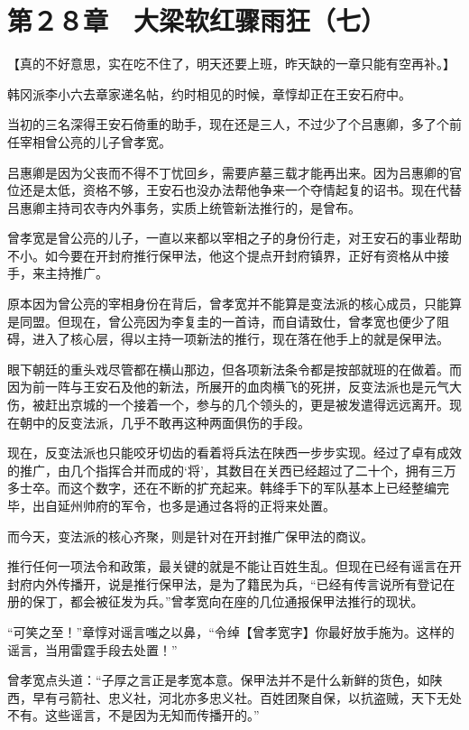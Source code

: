 \section{第２８章　大梁软红骤雨狂（七）}

【真的不好意思，实在吃不住了，明天还要上班，昨天缺的一章只能有空再补。】

韩冈派李小六去章家递名帖，约时相见的时候，章惇却正在王安石府中。

当初的三名深得王安石倚重的助手，现在还是三人，不过少了个吕惠卿，多了个前任宰相曾公亮的儿子曾孝宽。

吕惠卿是因为父丧而不得不丁忧回乡，需要庐墓三载才能再出来。因为吕惠卿的官位还是太低，资格不够，王安石也没办法帮他争来一个夺情起复的诏书。现在代替吕惠卿主持司农寺内外事务，实质上统管新法推行的，是曾布。

曾孝宽是曾公亮的儿子，一直以来都以宰相之子的身份行走，对王安石的事业帮助不小。如今要在开封府推行保甲法，他这个提点开封府镇界，正好有资格从中接手，来主持推广。

原本因为曾公亮的宰相身份在背后，曾孝宽并不能算是变法派的核心成员，只能算是同盟。但现在，曾公亮因为李复圭的一首诗，而自请致仕，曾孝宽也便少了阻碍，进入了核心层，得以主持一项新法的推行，现在落在他手上的就是保甲法。

眼下朝廷的重头戏尽管都在横山那边，但各项新法条令都是按部就班的在做着。而因为前一阵与王安石及他的新法，所展开的血肉横飞的死拼，反变法派也是元气大伤，被赶出京城的一个接着一个，参与的几个领头的，更是被发遣得远远离开。现在朝中的反变法派，几乎不敢再这种两面俱伤的手段。

现在，反变法派也只能咬牙切齿的看着将兵法在陕西一步步实现。经过了卓有成效的推广，由几个指挥合并而成的‘将’，其数目在关西已经超过了二十个，拥有三万多士卒。而这个数字，还在不断的扩充起来。韩绛手下的军队基本上已经整编完毕，出自延州帅府的军令，也多是通过各将的正将来处置。

而今天，变法派的核心齐聚，则是针对在开封推广保甲法的商议。

推行任何一项法令和政策，最关键的就是不能让百姓生乱。但现在已经有谣言在开封府内外传播开，说是推行保甲法，是为了籍民为兵，“已经有传言说所有登记在册的保丁，都会被征发为兵。”曾孝宽向在座的几位通报保甲法推行的现状。

“可笑之至！”章惇对谣言嗤之以鼻，“令绰【曾孝宽字】你最好放手施为。这样的谣言，当用雷霆手段去处置！”

曾孝宽点头道：“子厚之言正是孝宽本意。保甲法并不是什么新鲜的货色，如陕西，早有弓箭社、忠义社，河北亦多忠义社。百姓团聚自保，以抗盗贼，天下无处不有。这些谣言，不是因为无知而传播开的。”

